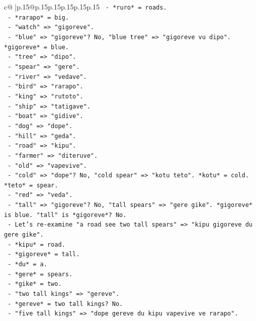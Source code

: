 \documentclass{article}
\begin{document}
{\begin{supertabular}{c@{$\;$}|p{.15\linewidth}@{}p{.15\linewidth}p{.15\linewidth}p{.15\linewidth}p{.15\linewidth}p{.15\linewidth}}
{{{\texttt{            {-} *ruro* = roads.} \\
\texttt{            {-} *rarapo* = big.} \\
\texttt{          {-} "watch" => "gigoreve".} \\
\texttt{          {-} "blue" => "gigoreve"? No, "blue tree" => "gigoreve vu dipo". *gigoreve* = blue.} \\
\texttt{          {-} "tree" => "dipo".} \\
\texttt{          {-} "spear" => "gere".} \\
\texttt{          {-} "river" => "vedave".} \\
\texttt{          {-} "bird" => "rarapo".} \\
\texttt{          {-} "king" => "rutoto".} \\
\texttt{          {-} "ship" => "tatigave".} \\
\texttt{          {-} "boat" => "gidive".} \\
\texttt{          {-} "dog" => "dope".} \\
\texttt{          {-} "hill" => "geda".} \\
\texttt{          {-} "road" => "kipu".} \\
\texttt{          {-} "farmer" => "diteruve".} \\
\texttt{          {-} "old" => "vapevive".} \\
\texttt{          {-} "cold" => "dope"? No, "cold spear" => "kotu teto". *kotu* = cold. *teto* = spear.} \\
\texttt{          {-} "red" => "veda".} \\
\texttt{          {-} "tall" => "gigoreve"? No, "tall spears" => "gere gike". *gigoreve* is blue. "tall" is *gigoreve*? No.} \\
\texttt{          {-} Let's re{-}examine "a road see two tall spears" => "kipu gigoreve du gere gike".} \\
\texttt{            {-} *kipu* = road.} \\
\texttt{            {-} *gigoreve* = tall.} \\
\texttt{            {-} *du* = a.} \\
\texttt{            {-} *gere* = spears.} \\
\texttt{            {-} *gike* = two.} \\
\texttt{          {-} "two tall kings" => "gereve".} \\
\texttt{            {-} *gereve* = two tall kings? No.} \\
\texttt{            {-} "five tall kings" => "dope gereve du kipu vapevive ve rarapo".} \\
}}}
\end{supertabular}}
\end{document}
